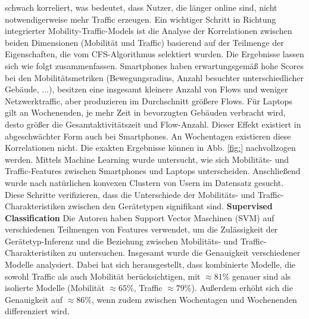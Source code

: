 \documentclass[12pt, a4paper]{article}
\begin{document}
schwach korreliert, was bedeutet, dass Nutzer, die länger online sind, nicht notwendigerweise mehr Traffic erzeugen. \cite{Alipour2018}
\newline\newline
Ein wichtiger Schritt in Richtung integrierter Mobility-Traffic-Models ist die Analyse der Korrelationen
zwischen beiden Dimensionen (Mobilität und Traffic) basierend auf der Teilmenge der Eigenschaften,
die vom \textsc{CFS}-Algorithmus selektiert wurden.\newline
Die Ergebnisse lassen sich wie folgt zusammenfassen. Smartphones haben erwartungsgemäß hohe Scores bei den Mobilitätsmetriken (Bewegungsradius,
Anzahl besuchter unterschiedlicher Gebäude, ...), besitzen eine
insgesamt kleinere Anzahl von Flows und weniger Netzwerktraffic, aber produzieren im Durchschnitt größere Flows.
Für Laptops gilt an Wochenenden, je mehr Zeit in bevorzugten Gebäuden verbracht wird, desto größer die Gesamtaktivitätszeit
und Flow-Anzahl. Dieser Effekt existiert in abgeschwächter Form auch bei Smartphones. 
An Wochentagen existieren diese Korrelationen nicht.\newline
Die exakten Ergebnisse können in Abb. \ref{fig:} nachvollzogen werden.
\newline\newline
Mittels Machine Learning wurde untersucht, wie sich Mobilitäts- und Traffic-Features zwischen
Smartphones und Laptops unterscheiden. Anschließend wurde nach natürlichen konvexen Clustern von Usern im
Datensatz gesucht. Diese Schritte verifizieren, dass die Unterschiede der Mobilitäts- und Traffic-Charakteristiken
zwischen den Gerätetypen signifikant sind.
\newline\newline
\textbf{Supervised Classification}\newline
Die Autoren haben Support Vector Maschinen (SVM) auf verschiedenen Teilmengen von Features
verwendet, um die Zulässigkeit der Gerätetyp-Inferenz und die Beziehung zwischen Mobilitäts- und Traffic-Charakteristiken
zu untersuchen. Insgesamt wurde die Genauigkeit verschiedener Modelle analysiert. Dabei hat sich herausgestellt,
dass kombinierte Modelle, die sowohl Traffic als auch Mobilität berücksichtigen, mit $\approx 81 \%$ genauer sind als isolierte Modelle
(Mobilität $\approx 65 \%$, Traffic $\approx 79 \%$). Außerdem erhöht sich die Genauigkeit auf $\approx 86 \%$, wenn
zudem zwischen Wochentagen und Wochenenden differenziert wird.
\newline\newline
\end{document}
